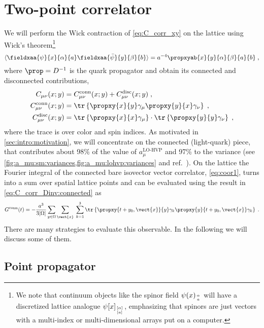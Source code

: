 \section{Two-point correlator}
\label{sec:2pt-corr}

We will perform the Wick contraction of \cref{eq:C_corr_xy} on the lattice using Wick's theorem\footnote{We note that continuum objects like the spinor field $\psi(x)_{\alpha \atop a}$ will have a discretized lattice analogue $\psi[x]_{[\alpha] \atop [a]}$, emphasizing that spinors are just vectors with a multi-index or multi-dimensional arrays put on a computer.}
\begin{equation}
\langle \fieldxaa{\psi}{x}{\alpha}{a} \fieldxaa{\bar{\psi}}{y}{\beta}{b} \rangle =
a^{-4} \propxyab{x}{y}{\alpha}{\beta}{a}{b} \;,
\end{equation}
where $\prop = D^{-1}$ is the quark propagator and obtain its connected and disconnected contributions,
\begin{align}
C_{\mu \nu}(x;y) &= C_{\mu \nu}^{\text{conn}}(x;y) + C_{\mu \nu}^{\text{disc}}(x;y) \;, \\
C_{\mu \nu}^{\text{conn}}(x;y) &=
\tr \left\{
  \propxy{x}{y} \gamma_{\mu} \propxy{y}{x} \gamma_{\nu}
\right\} \;, \label{eq:C_corr_Dinv:connected} \\
C_{\mu \nu}^{\text{disc}}(x;y) &=
\tr \left\{ \propxy{x}{x} \gamma_{\mu} \right\}
\cdot
\tr \left\{ \propxy{y}{y} \gamma_{\nu} \right\} \;,
\end{align}
where the trace is over color and spin indices.
As motivated in \cref{sec:intro:motivation}, we will concentrate on the connected (light-quark) piece, that contributes about 98\% of the value of $a_{\mu}^{\text{LO-HVP}}$ and 97\% to the variance (see \cref{fig:a_mu:sm:variances,fig:a_mu:lohvp:variances} and ref.~\cite{snowmass:2025}).
On the lattice the Fourier integral of the connected bare isovector vector correlator, \cref{eq:coor1}, turns into a sum over spatial lattice points and can be evaluated using the result in \cref{eq:C_corr_Dinv:connected} as
\begin{equation} \label{eq:G:corr:connected}
G^{\text{conn}}(t) =
- \frac{a^{3}}{3 \lvert \Omega \rvert}
\sum_{y \in \Omega}
\sum_{\vect{x}} \;
\sum_{k=1}^{3}
\tr \left\{
  \propxy{t+y_0, \vect{x}}{y} \gamma_k \propxy{y}{t+y_0, \vect{x}} \gamma_k
\right\} \;.
\end{equation}
There are many strategies to evaluate this observable. In the following we will discuss some of them.

\subsection{Point propagator}

